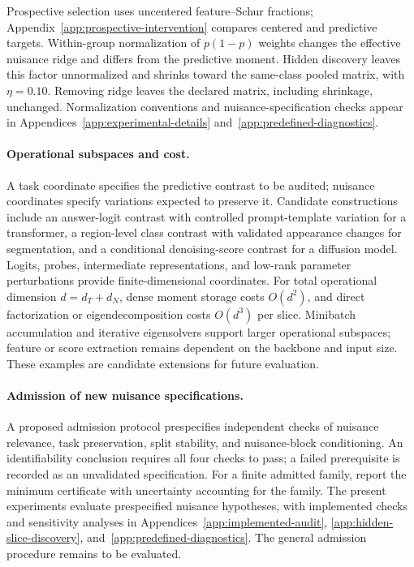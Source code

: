 Prospective selection uses uncentered feature--Schur fractions; Appendix~\ref{app:prospective-intervention} compares centered and predictive targets. Within-group normalization of $p(1-p)$ weights changes the effective nuisance ridge and differs from the predictive moment. Hidden discovery leaves this factor unnormalized and shrinks toward the same-class pooled matrix, with $\eta=0.10$. Removing ridge leaves the declared matrix, including shrinkage, unchanged. Normalization conventions and nuisance-specification checks appear in Appendices~\ref{app:experimental-details} and~\ref{app:predefined-diagnostics}.

\paragraph{Operational subspaces and cost.}
A task coordinate specifies the predictive contrast to be audited; nuisance coordinates specify variations expected to preserve it. Candidate constructions include an answer-logit contrast with controlled prompt-template variation for a transformer, a region-level class contrast with validated appearance changes for segmentation, and a conditional denoising-score contrast for a diffusion model. Logits, probes, intermediate representations, and low-rank parameter perturbations provide finite-dimensional coordinates. For total operational dimension $d=d_T+d_N$, dense moment storage costs $O(d^2)$, and direct factorization or eigendecomposition costs $O(d^3)$ per slice. Minibatch accumulation and iterative eigensolvers support larger operational subspaces; feature or score extraction remains dependent on the backbone and input size. These examples are candidate extensions for future evaluation.

\paragraph{Admission of new nuisance specifications.}
A proposed admission protocol prespecifies independent checks of nuisance relevance, task preservation, split stability, and nuisance-block conditioning. An identifiability conclusion requires all four checks to pass; a failed prerequisite is recorded as an unvalidated specification. For a finite admitted family, report the minimum certificate with uncertainty accounting for the family. The present experiments evaluate prespecified nuisance hypotheses, with implemented checks and sensitivity analyses in Appendices~\ref{app:implemented-audit}, \ref{app:hidden-slice-discovery}, and~\ref{app:predefined-diagnostics}. The general admission procedure remains to be evaluated.

